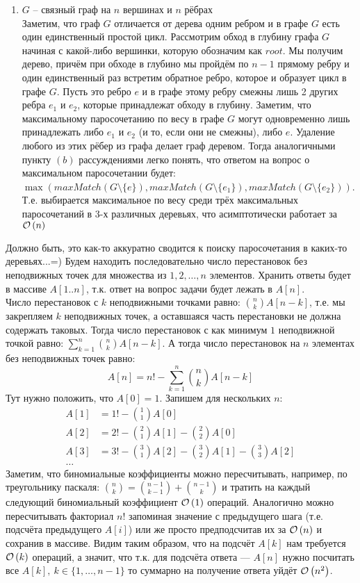 \begin{enumerate}[label=(\alph*)]
\item $G$ -- связный граф на $n$ вершинах и $n$ рёбрах\\
Заметим, что граф $G$ отличается от дерева одним ребром и в графе $G$ есть один единственный простой цикл. Рассмотрим
обход в глубину графа $G$ начиная с какой-либо вершинки, которую обозначим как $root$. Мы получим дерево, причём при
обходе в глубино мы пройдём по $n-1$ прямому ребру и один единственный раз встретим обратное ребро, которое и образует цикл
в графе $G$. Пусть это ребро $e$ и в графе этому ребру смежны лишь 2 других ребра $e_1$ и $e_2$, которые принадлежат обходу
в глубину. Заметим, что максимальному паросочетанию по весу в графе $G$ могут одновременно лишь принадлежать либо $e_1$ и $e_2$
(и то, если они не смежны), либо $e$. Удаление любого из этих рёбер из графа делает граф деревом. Тогда аналогичными 
пункту $(b)$ рассуждениями легко понять, что ответом на вопрос о максимальном паросочетании будет:
$\max{(maxMatch(G\setminus \lbrace e \rbrace), maxMatch(G\setminus \lbrace e_1 \rbrace), maxMatch(G\setminus \lbrace e_2 \rbrace))}$.
Т.е. выбирается максимальное по весу среди трёх максимальных паросочетаний в 3-х различных деревьях, что асимптотически
работает за $\mathcal{O}\left(n\right)$ \xqed
\end{enumerate}

Должно быть, это как-то аккуратно сводится к поиску паросочетания в каких-то деревьях...=)
Будем находить последовательно число перестановок без неподвижных точек для множества из $1,2,\ldots,n$ элементов. 
Хранить ответы будет в массиве $A[1..n]$, т.к. ответ на вопрос задачи будет лежать в $A[n]$.\\
Число перестановок с $k$ неподвижными точками равно: ${n \choose k}A[n-k]$, т.е. мы закрепляем $k$ неподвижных точек, а
оставшаяся часть перестановки не должна содержать таковых. Тогда число перестановок с как минимум $1$ неподвижной точкой
равно: $\sum_{k=1}^{n}{{n \choose k}A[n-k]}$. А тогда число перестановок на $n$ элементах без неподвижных точек равно:
\[
	A[n] = n! - \sum_{k=1}^{n}{{n \choose k}A[n-k]}
\]
Тут нужно положить, что $A[0]=1$. 
Запишем для нескольких $n$:
\begin{align*}
A[1] & = 1! - {1 \choose 1}A[0] \\
A[2] & = 2! - {2 \choose 1}A[1] - {2 \choose 2}A[0]\\
A[3] & = 3! - {3 \choose 1}A[2] - {3 \choose 2}A[1] - {3 \choose 3}A[2]\\
\ldots
\end{align*}
Заметим, что биномиальные коэффициенты можно пересчитывать, например, по треугольнику паскаля: 
${n \choose k} = {n-1 \choose k-1} + {n-1 \choose k}$ и тратить на каждый следующий биномиальный коэффициент $\mathcal{O}\left(1\right)$
операций. Аналогично можно пересчитывать факториал $n!$ запоминая значение с предыдущего шага (т.е. подсчёта предыдущего $A[i]$)
или же просто предподсчитав их за $\mathcal{O}\left(n\right)$ и сохранив в массиве. Видим таким образом, что на подсчёт $A[k]$ нам требуется
$\mathcal{O}\left(k\right)$ операций, а значит, что т.к. для подсчёта ответа --- $A[n]$ нужно посчитать все $A[k],\ k\in \lbrace 1,\ldots,n-1\rbrace$
то суммарно на получение ответа уйдёт $\mathcal{O}\left(n^2\right)$. \xqed 

